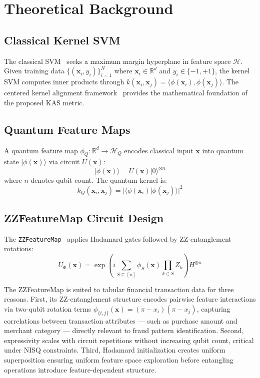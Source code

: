 \documentclass[journal]{IEEEtran}
\begin{document}
\section{Theoretical Background}
\label{sec:theory}

\subsection{Classical Kernel SVM}
The classical SVM~\cite{cortes1995} seeks a maximum 
margin hyperplane in feature space $\mathcal{H}$. Given 
training data $\{(\mathbf{x}_i, y_i)\}_{i=1}^{N}$ where 
$\mathbf{x}_i \in \mathbb{R}^d$ and $y_i \in \{-1, +1\}$, 
the kernel SVM computes inner products through 
$k(\mathbf{x}_i, \mathbf{x}_j) = 
\langle \phi(\mathbf{x}_i), \phi(\mathbf{x}_j) \rangle$. 
The centered kernel alignment framework~\cite{cristianini2001} 
provides the mathematical foundation of the proposed KAS metric.

\subsection{Quantum Feature Maps}
A quantum feature map $\phi_Q: \mathbb{R}^d \rightarrow 
\mathcal{H}_Q$ encodes classical input $\mathbf{x}$ into 
quantum state $|\phi(\mathbf{x})\rangle$ via circuit $U(\mathbf{x})$:
\begin{equation}
    |\phi(\mathbf{x})\rangle = U(\mathbf{x})|0\rangle^{\otimes n}
\end{equation}
where $n$ denotes qubit count. The quantum kernel is:
\begin{equation}
    k_Q(\mathbf{x}_i, \mathbf{x}_j) = 
    |\langle \phi(\mathbf{x}_i)|\phi(\mathbf{x}_j)\rangle|^2
\end{equation}

\subsection{ZZFeatureMap Circuit Design}
The \texttt{ZZFeatureMap}~\cite{havlicek2019} applies Hadamard 
gates followed by ZZ-entanglement rotations:
\begin{equation}
    U_{\Phi}(\mathbf{x}) = \exp\!\left(i\sum_{S \subseteq [n]} 
    \phi_S(\mathbf{x})\prod_{k \in S} Z_k\right) H^{\otimes n}
\end{equation}

The ZZFeatureMap is suited to tabular financial transaction data 
for three reasons. First, its ZZ-entanglement structure encodes 
pairwise feature interactions via two-qubit rotation terms 
$\phi_{\{i,j\}}(\mathbf{x}) = (\pi - x_i)(\pi - x_j)$, 
capturing correlations between transaction attributes --- such 
as purchase amount and merchant category --- directly relevant 
to fraud pattern identification. Second, expressivity scales 
with circuit repetitions without increasing qubit count, 
critical under NISQ constraints. Third, Hadamard initialization 
creates uniform superposition ensuring uniform feature space 
exploration before entangling operations introduce 
feature-dependent structure.
\end{document}
